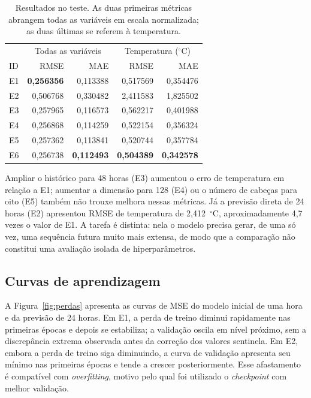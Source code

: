 \documentclass[conference,a4paper]{IEEEtran}
\begin{document}
\begin{table}[!t]
\centering
\caption{Resultados no teste. As duas primeiras métricas abrangem todas as variáveis em escala normalizada; as duas últimas se referem à temperatura.}
\label{tab:metricas}
\footnotesize
\begin{tabular}{@{}lrrrr@{}}
\toprule
 & \multicolumn{2}{c}{Todas as variáveis} & \multicolumn{2}{c}{Temperatura ($^\circ$C)} \\
ID & RMSE & MAE & RMSE & MAE \\
\midrule
E1 & \textbf{0,256356} & 0,113388 & 0,517569 & 0,354476 \\
E2 & 0,506768 & 0,330482 & 2,411583 & 1,825502 \\
E3 & 0,257965 & 0,116573 & 0,562217 & 0,401988 \\
E4 & 0,256868 & 0,114259 & 0,522154 & 0,356324 \\
E5 & 0,257362 & 0,113841 & 0,520744 & 0,357784 \\
E6 & 0,256738 & \textbf{0,112493} & \textbf{0,504389} & \textbf{0,342578} \\
\bottomrule
\end{tabular}
\end{table}

Ampliar o histórico para 48 horas (E3) aumentou o erro de temperatura em relação a E1; aumentar a dimensão para 128 (E4) ou o número de cabeças para oito (E5) também não trouxe melhora nessas métricas. Já a previsão direta de 24 horas (E2) apresentou RMSE de temperatura de 2,412~$^\circ$C, aproximadamente 4,7 vezes o valor de E1. A tarefa é distinta: nela o modelo precisa gerar, de uma só vez, uma sequência futura muito mais extensa, de modo que a comparação não constitui uma avaliação isolada de hiperparâmetros.

\subsection{Curvas de aprendizagem}
A Figura~\ref{fig:perdas} apresenta as curvas de MSE do modelo inicial de uma hora e da previsão de 24 horas. Em E1, a perda de treino diminui rapidamente nas primeiras épocas e depois se estabiliza; a validação oscila em nível próximo, sem a discrepância extrema observada antes da correção dos valores sentinela. Em E2, embora a perda de treino siga diminuindo, a curva de validação apresenta seu mínimo nas primeiras épocas e tende a crescer posteriormente. Esse afastamento é compatível com \emph{overfitting}, motivo pelo qual foi utilizado o \emph{checkpoint} com melhor validação.
\end{document}
